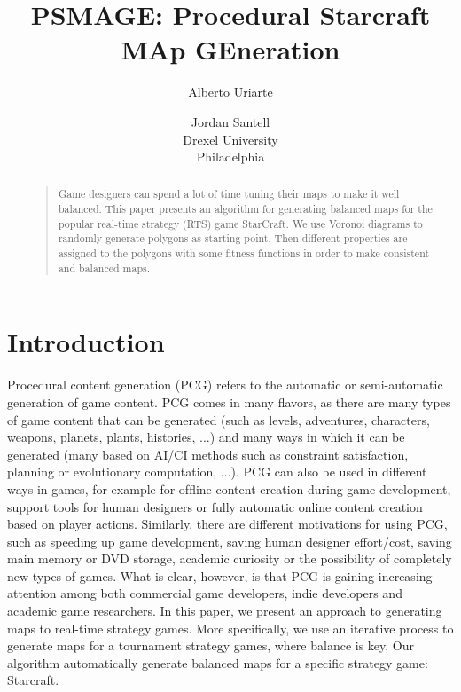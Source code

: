 \documentclass[letterpaper]{article}
\begin{document}
%
\title{PSMAGE: Procedural Starcraft MAp GEneration}
\author{Alberto Uriarte \and Jordan Santell\\
Drexel University\\
Philadelphia\\
}
\maketitle
\begin{abstract}
\begin{quote}
Game designers can spend a lot of time tuning their maps to make it well balanced. This paper presents an algorithm for generating balanced maps for the popular real-time strategy (RTS) game StarCraft. We use Voronoi diagrams to randomly generate polygons as starting point. Then different properties are assigned to the polygons with some fitness functions in order to make consistent and balanced maps.
\end{quote}
\end{abstract}


\section{Introduction} %
\label{sec:introduction}
Procedural content generation (PCG) refers to the automatic or semi-automatic generation of game content. PCG comes in many ﬂavors, as there are many types of game content that can be generated (such as levels, adventures, characters, weapons, planets, plants, histories, ...) and many ways in which it can be generated (many based on AI/CI methods such as constraint satisfaction, planning or evolutionary computation, ...). PCG can also be used in different ways in games, for example for ofﬂine content creation during game development, support tools for human designers or fully automatic online content creation based on player actions. Similarly, there are different motivations for using PCG, such as speeding up game development, saving human designer effort/cost, saving main memory or DVD storage, academic curiosity or the possibility of completely new types of games. What is clear, however, is that PCG is gaining increasing attention among both commercial game developers, indie developers and academic game researchers.
In this paper, we present an approach to generating maps to real-time strategy games. More speciﬁcally, we use an iterative process to generate maps for a tournament strategy games, where balance is key. Our algorithm automatically generate balanced maps for a specific strategy game: Starcraft.
\end{document}
